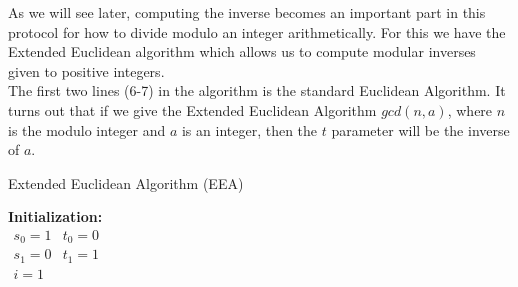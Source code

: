As we will see later, computing the inverse becomes an important part in this protocol for how to divide modulo an integer arithmetically. For this we have the Extended Euclidean algorithm which allows us to compute modular inverses given to positive integers. \\


\noindent
{} The first two lines (6-7) in the algorithm is the standard Euclidean Algorithm. It turns out that if we give the Extended Euclidean Algorithm $gcd(n,a)$, where $n$ is the modulo integer and $a$ is an integer, then the $t$ parameter will be the inverse of $a$. 

\begin{center}
\begin{algorithm}[H]
\caption{Extended Euclidean Algorithm (EEA)\label{alg}}



\textbf{Initialization:} \\
$
\begin{array}{ll}
    s_0 = 1   & t_0 = 0 \\
    s_1 = 0   & t_1 = 1 \\
      i = 1     &           \\
\end{array}                 
$

\end{algorithm}
\end{center}


